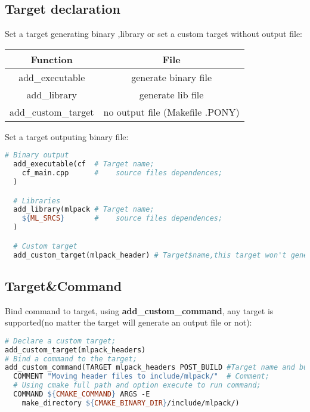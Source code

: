 \documentclass[11pt]{article}
\begin{document}
\subsection{Target declaration}%
\label{sub:target_declaration}

Set a target generating binary ,library or set a custom target without output file:

\begin{center}
  \begin{tabular}{|c|c|}
    \hline
     \textbf{Function} & \textbf{File} \\
    \hline
     add\_executable & generate binary file \\
    \hline
     add\_library & generate lib file  \\
    \hline
     add\_custom\_target & no output file (Makefile .PONY) \\
    \hline
  \end{tabular}
\end{center}

Set a target outputing binary file:

\begin{lstlisting}[language=make,label=lst:6lst,caption=Target declaration]
  # Binary output
  add_executable(cf  # Target name;
    cf_main.cpp      #    source files dependences;
  )

  # Libraries
  add_library(mlpack # Target name;
    ${ML_SRCS}       #    source files dependences;
  )

  # Custom target
  add_custom_target(mlpack_header) # Target$name,this target won't generate a file;
\end{lstlisting}


\indent
\subsection{Target\&Command}%
\label{sub:target&command}

Bind command to target, using \textbf{add\_custom\_command}, any target is supported(no matter the target will generate an output file or not):
\begin{lstlisting}[language=make,label=lst:7lst,caption=Target declaration]
# Declare a custom target;
add_custom_target(mlpack_headers)
# Bind a command to the target;
add_custom_command(TARGET mlpack_headers POST_BUILD #Target name and build event;
  COMMENT "Moving header files to include/mlpack/"  # Comment;
  # Using cmake full path and option execute to run command;
  COMMAND ${CMAKE_COMMAND} ARGS -E 
    make_directory ${CMAKE_BINARY_DIR}/include/mlpack/)  

\end{lstlisting}
\end{document}
